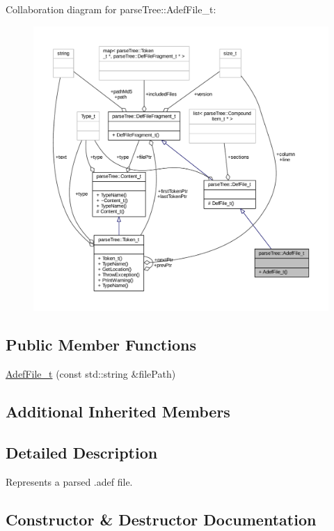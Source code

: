 Collaboration diagram for parse\+Tree\+:\+:Adef\+File\+\_\+t\+:
\nopagebreak
\begin{figure}[H]
\begin{center}
\leavevmode
\includegraphics[width=350pt]{structparse_tree_1_1_adef_file__t__coll__graph}
\end{center}
\end{figure}
\subsection*{Public Member Functions}
\begin{DoxyCompactItemize}
\item 
\hyperlink{structparse_tree_1_1_adef_file__t_a10cc995204ffa9332f7914bed380be05}{Adef\+File\+\_\+t} (const std\+::string \&file\+Path)
\end{DoxyCompactItemize}
\subsection*{Additional Inherited Members}


\subsection{Detailed Description}
Represents a parsed .adef file. 

\subsection{Constructor \& Destructor Documentation}
